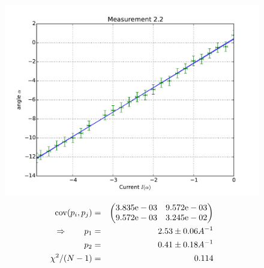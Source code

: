 \begin{figure}
    \begin{centering}
        \includegraphics[width=18cm]{figures/fig22}
\captionsetup{singlelinecheck=off} 
\caption[.]{
\begin{eqnarray}
    \mathrm{cov}(p_i, p_j) &=& 
    \begin{pmatrix}
        3.835\mathrm{e}-03 &9.572\mathrm{e}-03 \\
        9.572\mathrm{e}-03 &3.245\mathrm{e}-02 \\
    \end{pmatrix}
\\ \Rightarrow \qquad
    p_1 &=& 2.53 \pm 0.06 A^{-1}\\
    p_2 &=& 0.41 \pm 0.18 A^{-1} \\
    \chi ^2/(N-1) &=& 0.114
\end{eqnarray}
}


    \end{centering}
\end{figure}

